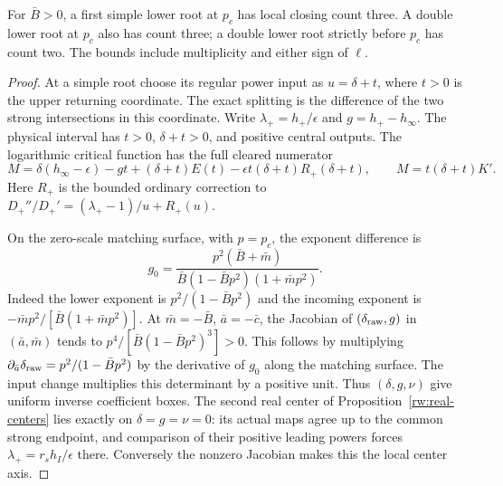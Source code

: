\begin{proposition}
\label{rw:infinity:strict-lower-loss}
For $\bar B>0$, a first simple lower root at $p_c$ has local
closing count three. A double lower root at $p_c$ also has count
three; a double lower root strictly before $p_c$ has count two.
The bounds include multiplicity and either sign of $\ell$.
\end{proposition}
\begin{proof}
At a simple root choose its regular power input as
$u=\delta+t$, where $t>0$ is the upper returning coordinate.
The exact splitting is the difference of the two strong intersections
in this coordinate. Write $\lambda_+=h_+/\epsilon$ and
$g=h_+-h_\infty$. The physical interval has
$t>0$, $\delta+t>0$, and positive central outputs. The logarithmic
critical function has the full cleared numerator
\[
 M=\delta(h_\infty-\epsilon)-gt+(\delta+t)E(t)
                       -\epsilon t(\delta+t)R_+(\delta+t),
 \qquad M=t(\delta+t)K'.
\]
Here $R_+$ is the bounded ordinary correction to
$D_+''/D_+'=(\lambda_+-1)/u+R_+(u)$.

On the zero-scale matching surface, with $p=p_c$, the exponent
difference is
\[
 g_0=\frac{p^2(\bar B+\bar m)}
 {\bar B(1-\bar Bp^2)(1+\bar mp^2)}.
\]
Indeed the lower exponent is $p^2/(1-\bar Bp^2)$ and the
incoming exponent is $-\bar mp^2/[\bar B(1+\bar mp^2)]$.
At $\bar m=-\bar B$, $\bar a=-\bar c$, the Jacobian of
$(\delta_{\rm raw},g)$ in $(\bar a,\bar m)$ tends to
$p^4/[\bar B(1-\bar Bp^2)^3]>0$. This follows by multiplying
$\partial_{\bar a}\delta_{\rm raw}=p^2/(1-\bar Bp^2)$ by
the derivative of $g_0$ along the matching surface.
The input change multiplies this determinant by a positive unit.
Thus $(\delta,g,\nu)$ give uniform inverse coefficient boxes.
The second real center of Proposition~\ref{rw:real-centers}
lies exactly on $\delta=g=\nu=0$: its actual maps agree up to
the common strong endpoint, and comparison of their positive leading
powers forces $\lambda_+=r_sh_I/\epsilon$ there. Conversely the
nonzero Jacobian makes this the local center axis.


\end{proof}
